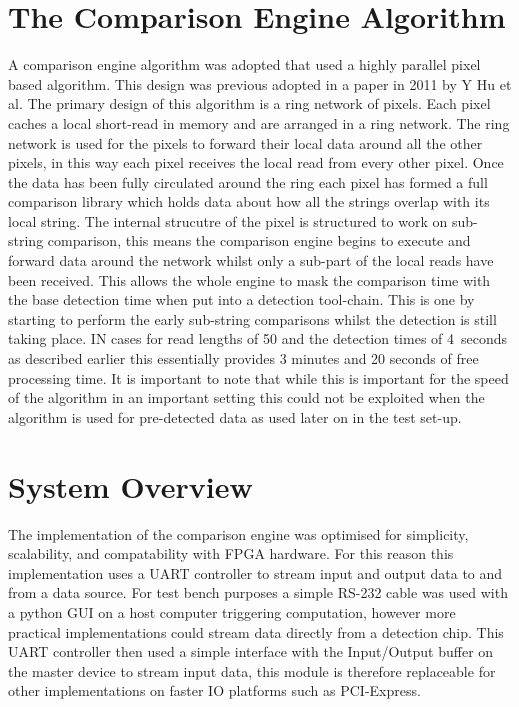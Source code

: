\documentclass[conference]{IEEEtran}
\begin{document}
\section{The Comparison Engine Algorithm}
A comparison engine algorithm was adopted that used a highly parallel pixel based algorithm. This design was previous adopted in a paper in 2011 by Y Hu et al. The primary design of this algorithm is a ring network of pixels. Each pixel caches a local short-read in memory and are arranged in a ring network. The ring network is used for the pixels to forward their local data around all the other pixels, in this way each pixel receives the local read from every other pixel. Once the data has been fully circulated around the ring each pixel has formed a full comparison library which holds data about how all the strings overlap with its local string. The internal strucutre of the pixel is structured to work on sub-string comparison, this means the comparison engine begins to execute and forward data around the network whilst only a sub-part of the local reads have been received. This allows the whole engine to mask the comparison time with the base detection time when put into a detection tool-chain. This is one by starting to perform the early sub-string comparisons whilst the detection is still taking place. IN cases for read lengths of 50 and the detection times of 4~seconds as described earlier this essentially provides 3 minutes and 20 seconds of free processing time. It is important to note that while this is important for the speed of the algorithm in an important setting this could not be exploited when the algorithm is used for pre-detected data as used later on in the test set-up.





\section{System Overview}



The implementation of the comparison engine was optimised for simplicity, scalability, and compatability with FPGA hardware. For this reason this implementation uses a UART controller to stream input and output data to and from a data source. For test bench purposes a simple RS-232 cable was used with a python GUI on a host computer triggering computation, however more practical implementations could stream data directly from a detection chip. This UART controller then used a simple interface with the Input/Output buffer on the master device to stream input data, this module is therefore replaceable for other implementations on faster IO platforms such as PCI-Express. 
\end{document}
